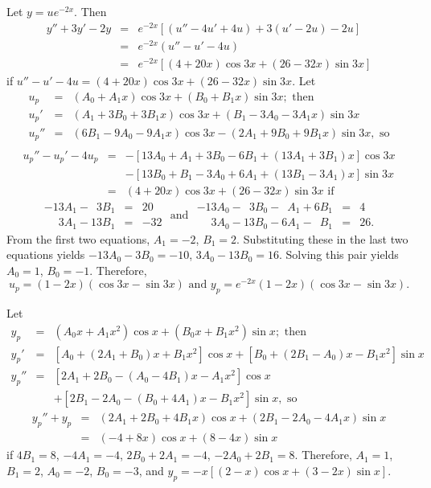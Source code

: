 \documentclass[dvips]{book}
\renewcommand{\exer}[1]{\par\medskip\;\noindent{\color{red}\bf #1.}}
\numberwithin{example}{section}
\numberwithin{equation}{section}
\numberwithin{theorem}{section}
\numberwithin{table}{section}
\numberwithin{figure}{section}
\begin{document}
\exer{5.5.6}
Let $y=ue^{-2x}$. Then
\begin{eqnarray*}
y''+3y'-2y&=&e^{-2x}\left[(u''-4u'+4u)+3(u'-2u)-2u\right]\\
&=&e^{-2x}(u''-u'-4u)\\ &=&
e^{-2x}\left[(4+20x)\cos 3x+(26-32x)\sin 3x\right]
\end{eqnarray*}
if $u''-u'-4u=(4+20x)\cos 3x+(26-32x)\sin 3x$.
Let
\begin{eqnarray*}
u_p&=&(A_0+A_1x)\cos3x+(B_0+B_1x)\sin3x; \mbox{ then}\\
u_p'&=&(A_1+3B_0+3B_1x)\cos3x+(B_1-3A_0-3A_1x)\sin3x\\
u_p''&=&(6B_1-9A_0-9A_1x)\cos3x-(2A_1+9B_0+9B_1x)\sin3x,\mbox{ so}\\
\end{eqnarray*}
\begin{eqnarray*}
u_p''-u_p'-4u_p&=&-\left[13A_0+A_1+3B_0-6B_1+(13A_1+3B_1)x\right]\cos3x
\\ &&-\left[13B_0+B_1-3A_0+6A_1+(13B_1-3A_1)x\right]\sin3x\\
&=&(4+20x)\cos 3x+(26-32x)\sin 3x \mbox{\ if}
\end{eqnarray*}
$$
\begin{array}{rcr}
-13A_1-\phantom{1}3B_1&=&20\\ \phantom{-1}3A_1-13B_1&=&-32
\end{array}
\mbox{ and }
\begin{array}{rcr}
-13A_0-\phantom{1}3B_0-\phantom{6}A_1+6B_1&=&4\phantom{.}\\
\phantom{-1}3A_0-13B_0-6A_1-\phantom{6}B_1&=&26.
\end{array}
$$
From the first two equations, $A_1=-2$, $B_1=2$. Substituting these in
the last two equations yields $-13A_0-3B_0=-10$, $3A_0-13B_0=16$.
Solving this pair yields $A_0=1$, $B_0=-1$. Therefore,
$$
 u_p=(1-2x)(\cos 3x-\sin 3x) \mbox{ and }
y_p=e^{-2x}(1-2x)(\cos 3x-\sin 3x).
$$


\exer{5.5.8}
Let
\begin{eqnarray*}
y_p&=&(A_0x+A_1x^2)\cos x+(B_0x+B_1x^2)\sin x;\mbox{ then}\\
y_p'&=&\left[A_0+(2A_1+B_0)x+B_1x^2\right]\cos x
+\left[B_0+(2B_1-A_0)x-B_1x^2\right]\sin x\\
y_p''&=&
\left[2A_1+2B_0-(A_0-4B_1)x-A_1x^2\right]\cos x\\ &&+
\left[2B_1-2A_0-(B_0+4A_1)x-B_1x^2\right]\sin x, \mbox{ so}
\end{eqnarray*}
\begin{eqnarray*}
y_p''+y_p&=&(2A_1+2B_0+4B_1x)\cos x+(2B_1-2A_0-4A_1x)\sin x\\ &=&
(-4+8x)\cos x+(8-4x)\sin x
\end{eqnarray*}
if $4B_1=8$, $-4A_1=-4$, $2B_0+2A_1=-4$, $-2A_0+2B_1=8$. Therefore,
$A_1=1$, $B_1=2$, $A_0=-2$, $B_0=-3$, and $y_p=-x\left[(2-x)\cos
x+(3-2x)\sin x\right]$.
\end{document}
